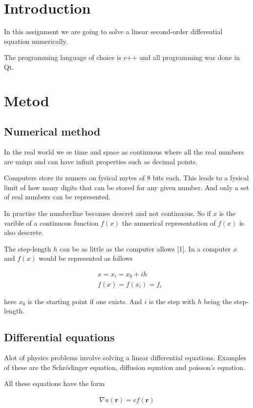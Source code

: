 \documentclass[11pt,twoside,a4paper,twocolumn]{article}
\newcommand{\nl}{

\medskip
\noindent
}
\begin{document}


\section*{Introduction}

In this assignment we are going to solve a linear second-order differential equation numerically.
\nl
The programming language of choice is c++ and all programming was done in Qt.

\section*{Metod}
\subsection*{Numerical method}

In the real world we se time and space as continuous where all the real numbers are uniqu and can have infinit properties such as decimal points. 
\nl
Computers store its numers on fysical mytes of 8 bits each. This leads to a fysical limit of how many digits that can be stored for any given number. And only a set of real numbers can be represented.
\nl
In practise the numberline becomes descret and not continuous. So if $x$ is the varible of a continuous function $f(x)$ the numerical representation of $f(x)$ is also descrete.
\nl
The step-length $h$ can be as little as the computer allows [1]. In a computer $x$ and $f(x)$ would be represented as follows

\begin{align*}
&x = x_i = x_0 + ih\\
&f(x) = f(x_i) = f_i
\end{align*}

here $x_0$ is the starting point if one exists. And $i$ is the step with $h$ being the step-length.

\subsection*{Differential equations}

Alot of physics problems involve solving a linear differential equations. Examples of these are the Schrödinger equation, diffusion equation and poisson's equation.
\nl
All these equations have the form 

\begin{align*}
\nabla u(\textbf{r}) = cf(\textbf{r})
\end{align*}
\end{document}
